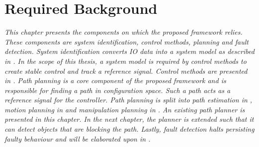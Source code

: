 \chapter{Required Background}%
\label{chap:required_background}
\textit{This chapter presents the components on which the proposed framework relies. These components are system identification, control methods, planning and fault detection. System identification converts \ac{IO} data into a system model as described in . In the scope of this thesis, a system model is required by control methods to create stable control and track a reference signal. Control methods are presented in . Path planning is a core component of the proposed framework and is responsible for finding a path in configuration space. Such a path acts as a reference signal for the controller. Path planning is split into path estimation in , motion planning in  and manipulation planning in .
An existing path planner is presented in this chapter. In the next chapter, the planner is extended such that it can detect objects that are blocking the path.
 Lastly, fault detection halts persisting faulty behaviour and will be elaborated upon in .\bs}

% 




